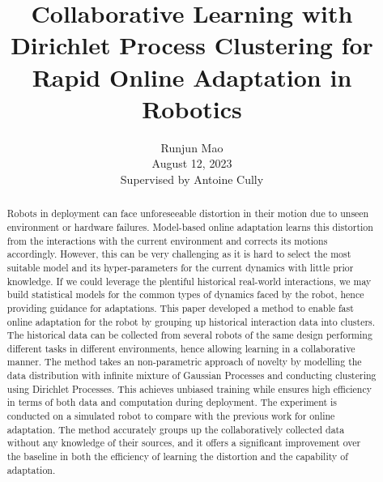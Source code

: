\documentclass[journal]{IEEEtran}
\title{Collaborative Learning with Dirichlet Process Clustering for Rapid Online Adaptation in Robotics}
\author{Runjun Mao \\ August 12, 2023 \\ Supervised by Antoine Cully}
\begin{document}
\maketitle

\begin{abstract}
\noindent
Robots in deployment can face unforeseeable distortion in their motion due to unseen environment or hardware failures. 
Model-based online adaptation learns this distortion from the interactions with the current environment and corrects its motions accordingly. However, this can be very challenging as it is hard to select the most suitable model and its hyper-parameters for the current dynamics with little prior knowledge.
If we could leverage the plentiful historical real-world interactions, we may build statistical models for the common types of dynamics faced by the robot, hence providing guidance for adaptations. 
This paper developed a method to enable fast online adaptation for the robot by grouping up historical  interaction data into clusters. 
The historical data can be collected from several robots of the same design performing different tasks in different environments, hence allowing learning in a collaborative manner. 
The method takes an non-parametric approach of novelty by modelling the data distribution with infinite mixture of Gaussian Processes and conducting clustering using Dirichlet Processes. 
This achieves unbiased training while ensures high efficiency in terms of both data and computation during deployment. 
The experiment is conducted on a simulated robot to compare with the previous work for online adaptation. 
The method accurately groups up the collaboratively collected data without any knowledge of their sources, and it offers a significant improvement over the baseline in both the efficiency of learning the distortion and the capability of adaptation. 

\end{abstract}











\end{document}
